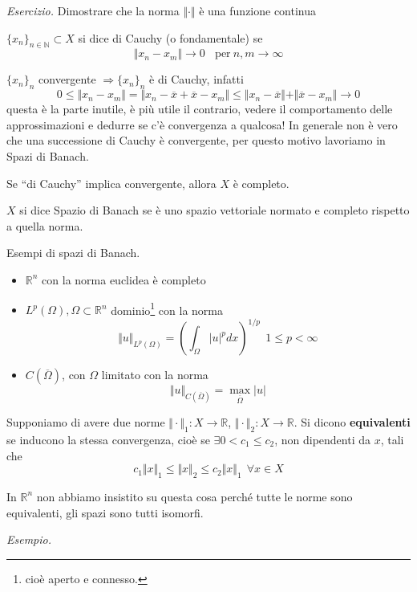 \documentclass[10pt,a4paper,twoside,openright]{book}
\begin{document}
\textit{Esercizio.} Dimostrare che la norma $\Vert \cdotp \Vert $ è una funzione continua
\begin{definition}
$\{x_{n}\}_{n\in \mathbb{N}} \subset X$ si dice di Cauchy (o fondamentale) se
\begin{equation*}
\Vert x_{n} -x_{m}\Vert \rightarrow 0\ \ \ \ \text{per} \ n,m\rightarrow \infty 
\end{equation*}
\end{definition}
$\{x_{n}\}_{n}$ convergente $\Rightarrow \{x_{n}\}_{n}$ è di Cauchy, infatti
\begin{equation*}
0\leqslant \Vert x_{n} -x_{m}\Vert =\Vert x_{n} -\overline{x} +\overline{x} -x_{m}\Vert \leqslant \Vert x_{n} -\overline{x}\Vert +\Vert \overline{x} -x_{m}\Vert \rightarrow 0
\end{equation*}
questa è la parte inutile, è più utile il contrario, vedere il comportamento delle approssimazioni e dedurre se c'è convergenza a qualcosa! In generale non è vero che una successione di Cauchy è convergente, per questo motivo lavoriamo in Spazi di Banach.
\begin{definition}
Se ``di Cauchy'' implica convergente, allora $X$ è completo.
\end{definition}
\begin{definition}
$X$ si dice Spazio di Banach se è uno spazio vettoriale normato e completo rispetto a quella norma.
\end{definition}
Esempi di spazi di Banach.
\begin{itemize}
\item $\mathbb{R}^{n}$ con la norma euclidea è completo
\item $L^{p}(\Omega),\Omega \subset \mathbb{R}^{n}$ dominio\footnote{cioè aperto e connesso.} con la norma\begin{equation*}
\Vert u\Vert _{L^{p}(\Omega)} =\left(\int _{\Omega }| u| ^{p} dx\right)^{1/p} \ \ 1\leqslant p< \infty 
\end{equation*}
\item $C(\overline{\Omega })$, con $\Omega $ limitato con la norma\begin{equation*}
\Vert u\Vert _{C(\overline{\Omega })} =\max_{\overline{\Omega }}| u| 
\end{equation*}
\end{itemize}
\begin{definition}
Supponiamo di avere due norme $\Vert \cdotp \Vert _{1} :X\rightarrow \mathbb{R}$, $\Vert \cdotp \Vert _{2} :X\rightarrow \mathbb{R}$. Si dicono \textbf{equivalenti} se inducono la stessa convergenza, cioè se $\exists 0< c_{1} \leqslant c_{2}$, non dipendenti da $x$, tali che
\begin{equation*}
c_{1}\Vert x\Vert _{1} \leqslant \Vert x\Vert _{2} \leqslant c_{2}\Vert x\Vert _{1} \ \ \forall x\in X
\end{equation*}
\end{definition}
\begin{nb}
In $\mathbb{R}^{n}$ non abbiamo insistito su questa cosa perché tutte le norme sono equivalenti, gli spazi sono tutti isomorfi.
\end{nb}
\textit{Esempio.}
\end{document}
